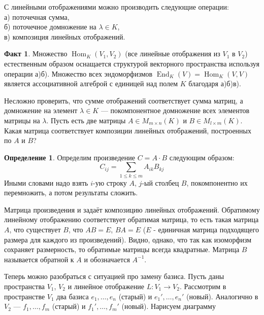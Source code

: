 \documentclass[10pt,a4paper,oneside]{book}
\theoremstyle{definition}
\newtheorem{defn}{Определение}
\newtheorem*{fact}{Факт}
\newcommand{\Hom}{\operatorname{Hom}}
\newcommand{\End}{\operatorname{End}}
\begin{document}
С линейными отображениями можно производить следующие операции:\\
а) поточечная сумма,\\
б) поточечное домножение на $\lambda\in K$,\\
в) композиция линейных отображений.

\begin{fact}
Множество $\Hom_K(V_1,V_2)$ (все линейные отображения из $V_1$ в $V_2$) естественным образом оснащается структурой векторного пространства используя операции а)б). Множество всех эндоморфизмов $\End_K(V)=\Hom_K(V,V)$ является ассоциативной алгеброй с единицей над полем $K$ благодаря а)б)в).
\end{fact}

Несложно проверить, что сумме отображений соответствует сумма матриц, а домножение на элемент $\lambda\in K$ --- покомпонентное домножение всех элементов матрицы на $\lambda$.
Пусть есть две матрицы $A\in M_{m\times n}(K)$ и $B\in M_{l\times m}(K)$. Какая матрица соответствует композиции линейных отображений, построенных по $A$ и $B$?

\begin{defn}
Определим произведение $C=A\cdot B$ следующим образом: 
$$C_{ij}= \sum_{1\leq k\leq m} A_{ik} B_{kj}$$
Иными словами надо взять $i$-ую строку $A$, $j$-ый столбец $B$, покомпонентно их перемножить, а потом результаты сложить.
\end{defn}

Матрица произведения и задаёт композицию линейных отображений. Обратимому линейному отображению соответствует обратимая матрица, то есть такая матрица $A$, что существует $B$, что $AB=E$, $BA=E$ ($E$ - единичная матрица подходящего размера для каждого из произведений). Видно, однако, что так как изоморфизм сохраняет размерность, то обратимые матрицы всегда квадратные. Матрица $B$ называется обратной к $A$ и обозначается $A^{-1}$.


Теперь можно разобраться с ситуацией про замену базиса. Пусть даны пространства $V_1$, $V_2$ и линейное отображение $L\colon V_1\to V_2$. Рассмотрим в пространстве $V_1$ два базиса $e_1,\dots, e_n$ (старый) и $e_1',\dots, e_n'$ (новый). Аналогично в $V_2$ --- $f_1,\dots, f_m$ (старый) и $f_1',\dots, f_m'$ (новый). Нарисуем диаграмму


\begin{center}
\end{center}
\end{document}
